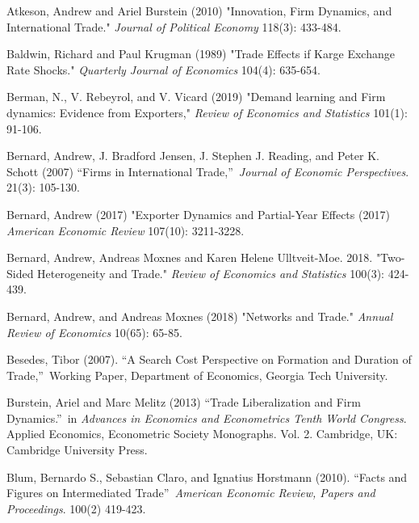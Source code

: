 \documentclass[12pt]{article}
\begin{document}
\begin{description}
\item Atkeson, Andrew and Ariel Burstein (2010) "Innovation, Firm Dynamics,
and International Trade." \textit{Journal of Political Economy} 118(3):
433-484.

\item Baldwin, Richard and Paul Krugman (1989) "Trade Effects if Karge
Exchange Rate Shocks." \textit{Quarterly Journal of Economics} 104(4):
635-654.

\item Berman, N., V. Rebeyrol, and V. Vicard (2019) "Demand learning and
Firm dynamics: Evidence from Exporters," \textit{Review of Economics and
Statistics }101(1): 91-106.

\item Bernard, Andrew, J. Bradford Jensen, J. Stephen J. Reading, and Peter
K. Schott (2007) \textquotedblleft Firms in International
Trade,\textquotedblright\ \textit{Journal of Economic Perspectives}. 21(3):
105-130.

\item Bernard, Andrew (2017) "Exporter Dynamics and Partial-Year Effects
(2017) \textit{American Economic Review }107(10): 3211-3228.

\item Bernard, Andrew, Andreas Moxnes and Karen Helene Ulltveit-Moe. 2018.
"Two-Sided Heterogeneity and Trade." \textit{Review of Economics and
Statistics }100(3): 424-439.

\item Bernard, Andrew, and Andreas Moxnes (2018) "Networks and Trade." 
\textit{Annual Review of Economics} 10(65): 65-85.

\item Besedes, Tibor (2007). \textquotedblleft A Search Cost Perspective on
Formation and Duration of Trade,\textquotedblright\ Working Paper,
Department of Economics, Georgia Tech University.

\item Burstein, Ariel and Marc Melitz (2013) \textquotedblleft Trade
Liberalization and Firm Dynamics.\textquotedblright\ in \textit{Advances in
Economics and Econometrics Tenth World Congress}. Applied Economics,
Econometric Society Monographs. Vol. 2. Cambridge, UK: Cambridge University
Press.

\item Blum, Bernardo S., Sebastian Claro, and Ignatius Horstmann (2010).
\textquotedblleft Facts and Figures on Intermediated
Trade\textquotedblright\ \textit{American Economic Review, Papers and
Proceedings}. 100(2) 419-423.


\end{description}
\end{document}
